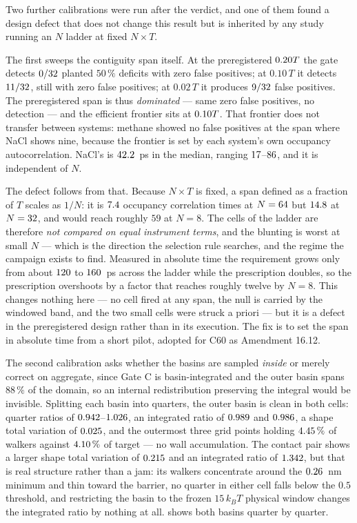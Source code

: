 Two further calibrations were run after the verdict, and one of them found a design defect that
does not change this result but is inherited by any study running an $N$ ladder at fixed
$N \times T$.

The first sweeps the contiguity span itself. At the preregistered $0.20 T$ the gate
detects $0/32$ planted $50\,\%$ deficits with zero false positives; at
$0.10\,T$ it detects $11/32$, still with zero false positives; at $0.02\,T$ it
produces $9/32$ false positives. The preregistered span is thus \emph{dominated}
--- same zero false positives, no detection --- and the efficient frontier sits at
$0.10 T$. That frontier does not transfer between systems: methane showed no false
positives at the span where NaCl shows nine, because the frontier is set by each system's own
occupancy autocorrelation. NaCl's is $42.2$~ps in the median, ranging
$17$--$86$, and it is independent of $N$.

The defect follows from that. Because $N \times T$ is fixed, a span defined as a fraction of $T$
scales as $1/N$: it is $7.4$ occupancy correlation times at $N = 64$ but
$14.8$ at $N = 32$, and would reach roughly $59$ at $N = 8$. The cells of the
ladder are therefore \emph{not compared on equal instrument terms}, and the blunting is worst at
small $N$ --- which is the direction the selection rule searches, and the regime the campaign
exists to find. Measured in absolute time the requirement grows only from about $120$
to $160$~ps across the ladder while the prescription doubles, so the prescription
overshoots by a factor that reaches roughly twelve by $N = 8$. This changes nothing here --- no
cell fired at any span, the null is carried by the windowed band, and the two small cells were
struck a priori --- but it is a defect in the preregistered design rather than in its execution.
The fix is to set the span in absolute time from a short pilot, adopted for C60 as Amendment
16.12.

The second calibration asks whether the basins are sampled \emph{inside} or merely correct on
aggregate, since Gate C is basin-integrated and the outer basin spans $88\,\%$ of the domain, so
an internal redistribution preserving the integral would be invisible. Splitting each basin into
quarters, the outer basin is clean in both cells: quarter ratios of $0.942$--$1.026$,
an integrated ratio of $0.989$ and $0.986$, a shape total variation of
$0.025$, and the outermost three grid points holding $4.45\,\%$ of walkers
against $4.10\,\%$ of target --- no wall accumulation. The contact pair shows a larger
shape total variation of $0.215$ and an integrated ratio of $1.342$, but that is
real structure rather than a jam: its walkers concentrate around the $0.26$~nm minimum and
thin toward the barrier, no quarter in either cell falls below the $0.5$ threshold, and
restricting the basin to the frozen $15\,k_BT$ physical window changes the integrated ratio by
nothing at all.  shows both basins quarter by quarter.

